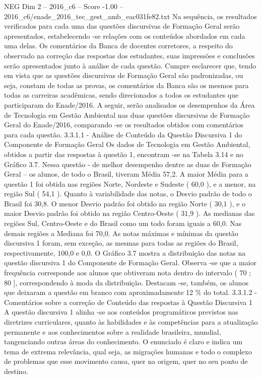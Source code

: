 \begin{textsample}{NEG Dim 2 – 2016\_c6 – Score -1.00 – 2016\_c6/enade\_2016\_tec\_gest\_amb\_eac031fe82.txt}
Na sequência, os resultados verificados para cada uma das questões discursivas de Formação Geral serão apresentados, estabelecendo -se relações com os conteúdos abordados em cada uma delas.
Os comentários da Banca de docentes corretores, a respeito do observado na correção das respostas dos estudantes, suas impressões e conclusões serão apresentados junto à análise de cada questão.
Cumpre esclarecer que, tendo em vista que as questões discursivas de Formação Geral são padronizadas, ou seja, constam de todas as provas, os comentários da Banca são os mesmos para todas as carreiras acadêmicas, sendo direcionados a todos os estudantes que participaram do Enade/2016.
A seguir, serão analisados os desempenhos da Área de Tecnologia em Gestão Ambiental nas duas questões discursivas de Formação Geral do Enade/2016, comparando -se os resultados obtidos com comentários para cada questão. 3.3.1.1 - Análise de Conteúdo da Questão Discursiva 1 do Componente de Formação Geral Os dados de Tecnologia em Gestão Ambiental, obtidos a partir das respostas à questão 1, encontram -se na Tabela 3.14 e no Gráfico 3.7.
Nessa questão - de melhor desempenho dentre as duas de Formação Geral – os alunos, de todo o Brasil, tiveram Média 57,2.
A maior Média para a questão 1 foi obtida nas regiões Norte, Nordeste e Sudeste ( 60,0 ), e a menor, na região Sul ( 54,1 ).
Quanto à variabilidade das notas, o Desvio padrão de todo o Brasil foi 30,8.
O menor Desvio padrão foi obtido na região Norte ( 30,1 ), e o maior Desvio padrão foi obtido na região Centro-Oeste ( 31,9 ).
As medianas das regiões Sul, Centro-Oeste e do Brasil como um todo foram iguais a 60,0.
Nas demais regiões a Mediana foi 70,0.
As notas máximas e mínimas da questão discursiva 1 foram, sem exceção, as mesmas para todas as regiões do Brasil, respectivamente, 100,0 e 0,0.
O Gráfico 3.7 mostra a distribuição das notas na questão discursiva 1 do Componente de Formação Geral.
Observa -se que a maior frequência corresponde aos alunos que obtiveram nota dentro do intervalo ( 70 ; 80 ], correspondendo à moda da distribuição.
Destacam -se, também, os alunos que deixaram a questão em branco com aproximadamente 12 \% do total. 3.3.1.2 - Comentários sobre a correção de Conteúdo das respostas à Questão Discursiva 1 A questão discursiva 1 alinha -se aos conteúdos programáticos previstos nas diretrizes curriculares, quanto às habilidades e às competências para a atualização permanente e aos conhecimentos sobre a realidade brasileira, mundial, tangenciando outras áreas do conhecimento.
O enunciado é claro e indica um tema de extrema relevância, qual seja, as migrações humanas e todo o complexo de problemas que esse movimento causa, quer na origem, quer no seu ponto de destino.

\end{textsample}

